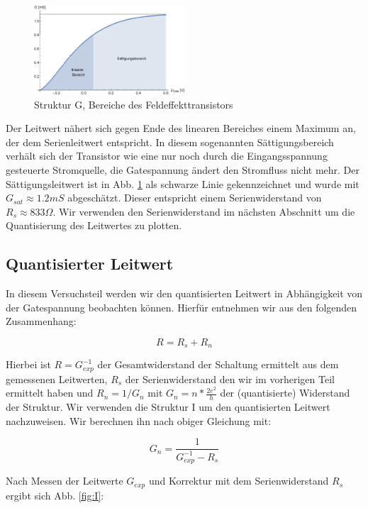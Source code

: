 \documentclass[aps,twocolumn,secnumarabic,nobalancelastpage,amsmath,amssymb,
nofootinbib,superscriptaddress]{revtex4-1}
\begin{document}
\begin{figure}[h]
  \centering
  \includegraphics[width=0.5\textwidth]{Berechnung-Bilder/g.eps}
  \caption{Struktur G, Bereiche des Feldeffekttransistors}
  \label{fig:G}
\end{figure}

Der Leitwert nähert sich gegen Ende des linearen
Bereiches einem Maximum an, der dem Serienleitwert entspricht. In diesem sogenannten
Sättigungsbereich verhält sich der Transistor wie eine nur noch durch die Eingangsspannung
gesteuerte Stromquelle, die Gatespannung ändert den Stromfluss nicht mehr. Der
Sättigungsleitwert ist in Abb. \ref{fig:G} als schwarze Linie gekennzeichnet und
wurde mit $G_{sat} \approx 1.2 mS$ abgeschätzt. Dieser entspricht einem Serienwiderstand
von $R_s \approx 833 \Omega$. Wir verwenden den Serienwiderstand im nächsten Abschnitt
um die Quantisierung des Leitwertes zu plotten.


\subsection{Quantisierter Leitwert}
In diesem Versuchsteil werden wir den quantisierten Leitwert in Abhängigkeit von
der Gatespannung beobachten können. Hierfür entnehmen wir aus \cite{skript11}
den folgenden Zusammenhang:

  \begin{equation}
    R = R_s + R_n
  \end{equation}

Hierbei ist $R = G_{exp}^{-1}$ der Gesamtwiderstand der Schaltung ermittelt aus
dem gemessenen Leitwerten, $R_s$ der Serienwiderstand den wir im vorherigen Teil
ermittelt haben und $R_n = 1/G_n$ mit $G_n = n*\frac{2e^2}{h} $ der
(quantisierte) Widerstand der Struktur. Wir verwenden die Struktur I um den
quantisierten Leitwert nachzuweisen. Wir berechnen ihn nach obiger Gleichung mit:

  \begin{equation}
    G_n = \frac{1}{G_{exp}^{-1}-R_s}
  \end{equation}

Nach Messen der Leitwerte $G_{exp}$ und Korrektur mit dem Serienwiderstand $R_s$
ergibt sich Abb. \ref{fig:I}:
\end{document}
